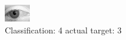 \begin{figure}[h!]
\begin{center}
\includegraphics[width=0.60\columnwidth]{figures/ID2791_class_4_target_3.png}
\end{center}
\caption{ Classification: 4 actual target: 3}
\label{fig:ID2791_class_4_target_3}
\end{figure}

